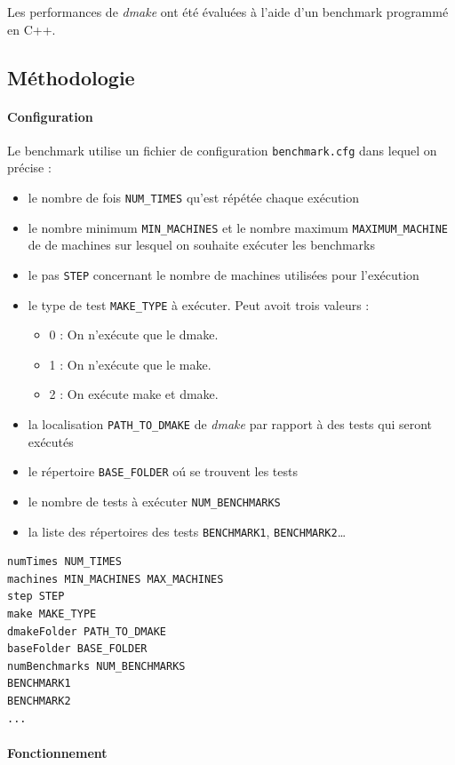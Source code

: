 \documentclass[a4paper,12pt,twoside]{article}
\begin{document}
Les performances de \emph{dmake} ont été évaluées à l'aide d'un
benchmark programmé en C++.

\subsection{Méthodologie}

\paragraph{Configuration}
Le benchmark utilise un fichier de configuration
\texttt{benchmark.cfg} dans lequel on précise : 
\begin{itemize}
\item le nombre de fois
\texttt{NUM\_TIMES} qu'est répétée chaque exécution
\item  le nombre minimum \texttt{MIN\_MACHINES}
et le nombre maximum \texttt{MAXIMUM\_MACHINE} de de machines 
sur lesquel on souhaite exécuter les benchmarks
\item le pas \texttt{STEP} concernant le nombre de machines utilisées
  pour l'exécution
\item le type de test \texttt{MAKE\_TYPE} à exécuter. Peut avoit trois valeurs :
	\begin{itemize}
	\item  0 : On n'exécute que le dmake.
	\item  1 : On n'exécute que le make.
	\item  2 : On exécute make et dmake.
	\end{itemize}
\item la localisation \texttt{PATH\_TO\_DMAKE} de \emph{dmake}
par rapport à des tests qui seront exécutés
\item le répertoire \texttt{BASE\_FOLDER} oú se trouvent les tests
\item le nombre de tests à exécuter \texttt{NUM\_BENCHMARKS}
\item la liste des répertoires des tests \texttt{BENCHMARK1}, \texttt{BENCHMARK2}\dots
\end{itemize}

\begin{verbatim}
numTimes NUM_TIMES
machines MIN_MACHINES MAX_MACHINES
step STEP
make MAKE_TYPE
dmakeFolder PATH_TO_DMAKE
baseFolder BASE_FOLDER
numBenchmarks NUM_BENCHMARKS
BENCHMARK1
BENCHMARK2
...
\end{verbatim}

\paragraph{Fonctionnement}
\end{document}

